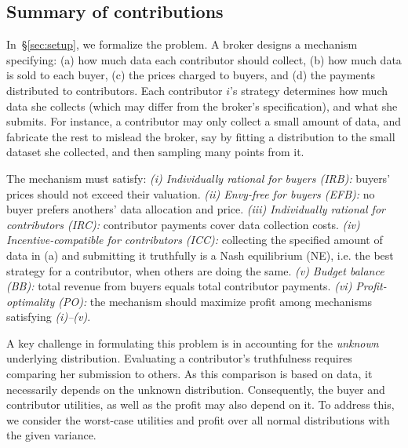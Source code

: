 




\subsection{Summary of contributions}
\label{sec:contributions}

In~\S\ref{sec:setup}, we formalize the problem. A broker designs a mechanism specifying:  
(a) how much data each contributor should collect,  
(b) how much data is sold to each buyer,  
(c) the prices charged to buyers, and  
(d) the payments distributed to contributors.  
Each contributor $i$'s strategy determines how much data she collects (which may differ from the broker’s specification), and what she submits. For instance, a contributor may only collect a small amount of data, and fabricate the rest to mislead the broker, say by fitting a distribution to the small dataset she collected, and then sampling many points from it.


The mechanism must satisfy:  
\emph{(i) Individually rational for buyers (IRB):} buyers' prices should not exceed their valuation.  
\emph{(ii) Envy-free for buyers (EFB):} no buyer prefers anothers' data allocation and price.  
\emph{(iii) Individually rational for contributors (IRC):} contributor payments cover data collection costs.  
\emph{(iv) Incentive-compatible for contributors (ICC):} collecting the specified amount of data in (a) and submitting it truthfully is a Nash equilibrium (NE), i.e. the best strategy for a contributor, when others are doing the same.
\emph{(v) Budget balance (BB):} total revenue from buyers equals total contributor payments.  
\emph{(vi) Profit-optimality (PO):} the mechanism should maximize profit among mechanisms satisfying
\emph{(i)--(v)}.  



A key challenge in formulating this problem is in accounting for the \emph{unknown} underlying distribution. 
Evaluating a contributor's truthfulness requires comparing her submission to others. As this comparison is based on data, it necessarily depends on the 
unknown distribution.
Consequently, the buyer and contributor utilities, as well as the profit may also depend on it.
To address this, we consider the worst-case utilities and profit over all normal distributions with the given variance.


